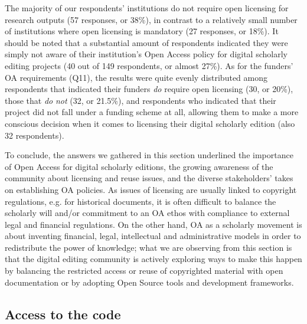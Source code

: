 \begin{paper}
The majority of our respondents' institutions do not require open
licensing for research outputs (57 responses, or 38\%), in contrast to a
relatively small number of institutions where open licensing is
mandatory (27 responses, or 18\%). It should be noted that a substantial
amount of respondents indicated they were simply not aware of their
institution's Open Access policy for digital scholarly editing projects
(40 out of 149 respondents, or almost 27\%). As for the funders' OA
requirements (Q11), the results were quite evenly distributed among
respondents that indicated their funders \emph{do} require open
licensing (30, or 20\%), those that \emph{do} \emph{not} (32, or
21.5\%), and respondents who indicated that their project did not fall
under a funding scheme at all, allowing them to make a more conscious
decision when it comes to licensing their digital scholarly edition
(also 32 respondents).

To conclude, the answers we gathered in this section underlined the
importance of Open Access for digital scholarly editions, the growing
awareness of the community about licensing and reuse issues, and the
diverse stakeholders' takes on establishing OA policies. As issues of
licensing are usually linked to copyright regulations, e.g. for
historical documents, it is often difficult to balance the scholarly
will and/or commitment to an OA ethos with compliance to external legal
and financial regulations. On the other hand, OA as a scholarly movement
is about inventing financial, legal, intellectual and administrative
models in order to redistribute the power of knowledge; what we are
observing from this section is that the digital editing community is
actively exploring ways to make this happen by balancing the restricted
access or reuse of copyrighted material with open documentation or by
adopting Open Source tools and development frameworks.

\subsection{Access to the code}


\end{paper}
